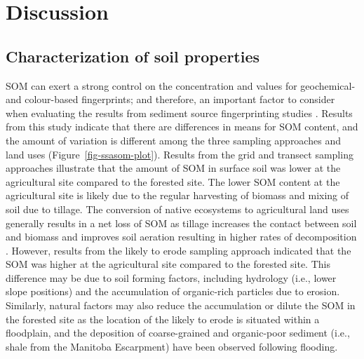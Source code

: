\documentclass[
  number]{elsarticle}
\begin{document}
\section{Discussion}\label{discussion}

\subsection{Characterization of soil
properties}\label{characterization-of-soil-properties-1}

SOM can exert a strong control on the concentration and values for
geochemical- and colour-based fingerprints; and therefore, an important
factor to consider when evaluating the results from sediment source
fingerprinting studies \citep{horowitz1991, viscarrarossel2009}. Results
from this study indicate that there are differences in means for SOM
content, and the amount of variation is different among the three
sampling approaches and land uses (Figure~\ref{fig-ssasom-plot}).
Results from the grid and transect sampling approaches illustrate that
the amount of SOM in surface soil was lower at the agricultural site
compared to the forested site. The lower SOM content at the agricultural
site is likely due to the regular harvesting of biomass and mixing of
soil due to tillage. The conversion of native ecosystems to agricultural
land uses generally results in a net loss of SOM as tillage increases
the contact between soil and biomass and improves soil aeration
resulting in higher rates of decomposition \citep{brady2001}. However,
results from the likely to erode sampling approach indicated that the
SOM was higher at the agricultural site compared to the forested site.
This difference may be due to soil forming factors, including hydrology
(i.e., lower slope positions) and the accumulation of organic-rich
particles due to erosion. Similarly, natural factors may also reduce the
accumulation or dilute the SOM in the forested site as the location of
the likely to erode is situated within a floodplain, and the deposition
of coarse-grained and organic-poor sediment (i.e., shale from the
Manitoba Escarpment) have been observed following flooding.
\end{document}
